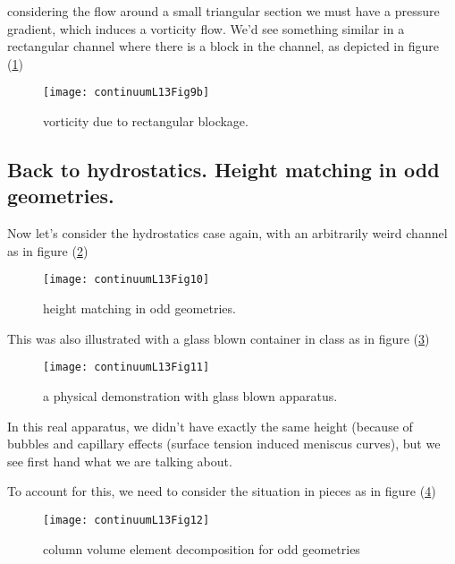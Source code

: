 considering the flow around a small triangular section we must have a pressure gradient, which induces a vorticity flow.  We'd see something similar in a rectangular channel where there is a block in the channel, as depicted in figure (\ref{fig:continuumL13:continuumL13Fig9b})

\begin{figure}[htp]
   \centering
   \texttt{[image: continuumL13Fig9b]}
   \caption{vorticity due to rectangular blockage.}\label{fig:continuumL13:continuumL13Fig9b}
\end{figure}

\subsection{Back to hydrostatics.  Height matching in odd geometries.}

Now let's consider the hydrostatics case again, with an arbitrarily weird channel as in figure (\ref{fig:continuumL13:continuumL13Fig10})

\begin{figure}[htp]
   \centering
   \texttt{[image: continuumL13Fig10]}
   \caption{height matching in odd geometries.}\label{fig:continuumL13:continuumL13Fig10}
\end{figure}

This was also illustrated with a glass blown container in class as in figure (\ref{fig:continuumL13:continuumL13Fig11})

\begin{figure}[htp]
   \centering
   \texttt{[image: continuumL13Fig11]}
   \caption{a physical demonstration with glass blown apparatus.}\label{fig:continuumL13:continuumL13Fig11}
\end{figure}

In this real apparatus, we didn't have exactly the same height (because of bubbles and capillary effects (surface tension induced meniscus curves), but we see first hand what we are talking about.

To account for this, we need to consider the situation in pieces as in figure (\ref{fig:continuumL13:continuumL13Fig12})

\begin{figure}[htp]
   \centering
   \texttt{[image: continuumL13Fig12]}
   \caption{column volume element decomposition for odd geometries}\label{fig:continuumL13:continuumL13Fig12}
\end{figure}

